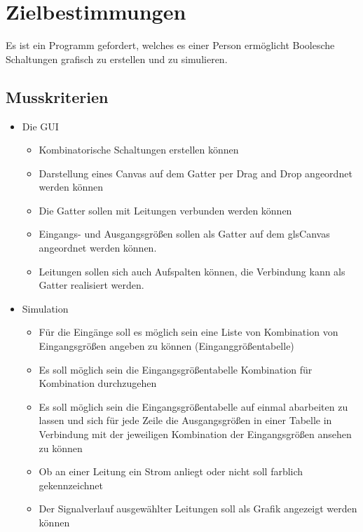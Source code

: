 
\section{Zielbestimmungen}


Es ist ein Programm gefordert, welches es einer Person ermöglicht Boolesche Schaltungen grafisch zu erstellen und zu simulieren.

\subsection{Musskriterien}

\begin{itemize}
	\item Die \gls{GUI}
	
	\begin{itemize}
		\item Kombinatorische Schaltungen erstellen können
		\item Darstellung eines \gls{Canvas} auf dem Gatter per \gls{Drag and Drop} angeordnet werden können
		\item Die Gatter sollen mit Leitungen verbunden werden können
		\item Eingangs- und Ausgangsgrößen sollen als Gatter auf dem gls{Canvas} angeordnet werden können.
		\item Leitungen sollen sich auch Aufspalten können, die Verbindung kann als Gatter realisiert werden.
		

	\end{itemize}

	\item Simulation
	
	\begin{itemize}
		\item Für die Eingänge soll es möglich sein eine Liste von Kombination von Eingangsgrößen angeben zu können (Einganggrößentabelle)
		\item Es soll möglich sein die Eingangsgrößentabelle Kombination für Kombination durchzugehen
		\item Es soll möglich sein die Eingangsgrößentabelle auf einmal abarbeiten zu lassen und sich für jede Zeile die Ausgangsgrößen in einer Tabelle in Verbindung mit der jeweiligen Kombination der Eingangsgrößen ansehen zu können
		\item Ob an einer Leitung ein Strom anliegt oder nicht soll farblich gekennzeichnet
		\item Der Signalverlauf ausgewählter Leitungen soll als Grafik angezeigt werden können
	\end{itemize}


\end{itemize}
